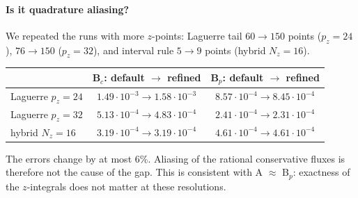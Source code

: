 \documentclass[11pt,a4paper]{article}
\begin{document}
\paragraph{Is it quadrature aliasing?}
We repeated the runs with more $z$-points: Laguerre tail $60\to150$ points
($p_z=24$), $76\to150$ ($p_z=32$), and interval rule $5\to9$ points (hybrid
$N_z=16$).
\begin{center}
\begin{tabular}{@{}lcc@{}}
\toprule
& B$_c$: default $\to$ refined & B$_p$: default $\to$ refined\\
\midrule
Laguerre $p_z=24$ & $1.49\cdot10^{-3}\to1.58\cdot10^{-3}$ & $8.57\cdot10^{-4}\to8.45\cdot10^{-4}$\\
Laguerre $p_z=32$ & $5.13\cdot10^{-4}\to4.83\cdot10^{-4}$ & $2.41\cdot10^{-4}\to2.31\cdot10^{-4}$\\
hybrid $N_z=16$ & $3.19\cdot10^{-4}\to3.19\cdot10^{-4}$ & $4.61\cdot10^{-4}\to4.61\cdot10^{-4}$\\
\bottomrule
\end{tabular}
\end{center}
The errors change by at most 6\%. Aliasing of the rational conservative fluxes is
therefore not the cause of the gap. This is consistent with A $\approx$ B$_p$:
exactness of the $z$-integrals does not matter at these resolutions.
\end{document}

